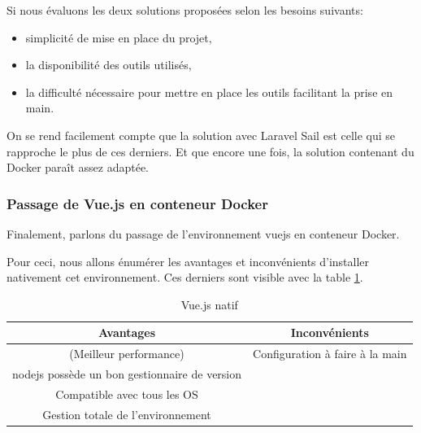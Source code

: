 \documentclass[
    iai, %
    il, %
]{heig-tb}
\begin{document}
Si nous évaluons les deux solutions proposées selon les besoins suivants:
\begin{itemize}
    \item simplicité de mise en place du projet,
    \item la disponibilité des outils utilisés,
    \item la difficulté nécessaire pour mettre en place les outils facilitant la prise en main.
\end{itemize}

On se rend facilement compte que la solution avec Laravel Sail est celle qui se rapproche le plus de ces derniers. Et que encore une fois, la solution contenant du Docker paraît assez adaptée.


\subsubsection{Passage de Vue.js en conteneur Docker}
Finalement, parlons du passage de l'environnement \Gls{vuejs} en conteneur Docker.

Pour ceci, nous allons énumérer les avantages et inconvénients d'installer nativement cet
environnement. Ces derniers sont visible avec la table \ref{dev-vuejs-native}.

\begin{table}[h]
    \begin{center}
        \caption{Vue.js natif \label{dev-vuejs-native}}
        \begin{tabular}{c|c}
            Avantages                                           & Inconvénients                   \\ \hline
            (Meilleur performance)                              & Configuration à faire à la main \\
            \Gls{nodejs} possède un bon gestionnaire de version &                                 \\
            Compatible avec tous les OS                         &                                 \\
            Gestion totale de l'environnement                   &                                 \\
        \end{tabular}
    \end{center}
\end{table}
\end{document}
